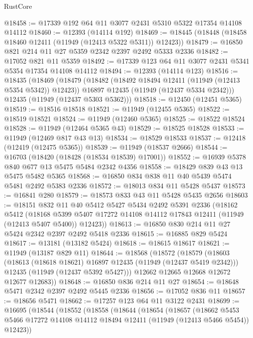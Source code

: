 \begin{lexlean}{RustCore}
\begin{coremodule}
@18458 := @17339 @192 @64 @11 @3077 @2431 @5310 @5322 @17354 @14108 @14112
@18460 := @12393 (@14114 @192)
@18469 := @18445 (@18448 (@18458 @18460 @12411 (@11949 (@12413 @5322 @5311)) @12423))
@18479 := @16850 @821 @214 @11 @27 @5359 @2342 @2397 @2492 @5333 @2336
@18482 := @17052 @821 @11 @5359
@18492 := @17339 @123 @64 @11 @3077 @2431 @5341 @5354 @17354 @14108 @14112
@18494 := @12393 (@14114 @123)
@18516 := @18435
    (@18469
      (@18479
        (@18482 (@18492 @18494 @12411 (@11949 (@12413 @5354 @5342)) @12423))
        @16897
        @12435
        (@11949 (@12437 @5334 @2342)))
      @12435
      (@11949 (@12437 @5303 @5362)))
@18518 := @12450 (@12451 @5365)
@18519 := @18516 @18518
@18521 := @11949 (@12455 @5365)
@18522 := @18519 @18521
@18524 := @11949 (@12460 @5365)
@18525 := @18522 @18524
@18528 := @11949 (@12464 @5365 @43)
@18529 := @18525 @18528
@18533 := @11949 (@12469 @817 @43 @13)
@18534 := @18529 @18533
@18537 := @12418 (@12419 (@12475 @5365))
@18539 := @11949 (@18537 @2666)
@18544 := @16703 (@18420 (@18428 (@18534 @18539) @17001))
@18552 := @16939 @5378 @840 @677 @13 @5475 @5484 @2342 @4356
@18558 := @18429 @839 @43 @13 @5475 @5482 @5365
@18568 := @16850 @834 @838 @11 @40 @5439 @5474 @5481 @2492 @5383 @2336
@18572 := @18013 @834 @11 @5428 @5437
@18573 := @16841 @280
@18579 := @18573 @833 @43 @11 @5428 @5435 @2656
@18603 := @18151
    @832
    @11
    @40
    @5412
    @5427
    @5434
    @2492
    @5391
    @2336
    (@18162
      @5412
      (@18168 @5399 @5407 @17272 @14108 @14112 @17843 @12411 (@11949 (@12413 @5407 @5400)) @12423))
@18613 := @16850 @830 @214 @11 @27 @5424 @2342 @2397 @2492 @5418 @2336
@18615 := @16885 @829 @5424
@18617 := @13181 (@13182 @5424)
@18618 := @18615 @18617
@18621 := @11949 (@13187 @829 @11)
@18644 := @18568
    (@18572
      (@18579
        (@18603
          (@18613 (@18618 @18621) @16897 @12435 (@11949 (@12437 @5419 @2342)))
          @12435
          (@11949 (@12437 @5392 @5427)))
        @12662
        @12665
        @12668
        @12672
        @12677
        @12683))
@18648 := @16850 @836 @214 @11 @27
@18654 := @18648 @5471 @2342 @2397 @2492 @5445 @2336
@18656 := @17052 @836 @11
@18657 := @18656 @5471
@18662 := @17257 @123 @64 @11 @3122 @2431
@18699 := @16695
    (@18544
      (@18552
        (@18558
          (@18644
            (@18654
              (@18657
                (@18662
                  @5453
                  @5466
                  @17272
                  @14108
                  @14112
                  @18494
                  @12411
                  (@11949 (@12413 @5466 @5454))
                  @12423))

\end{coremodule}
\end{lexlean}
